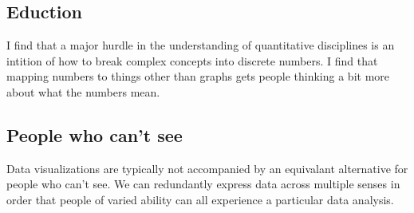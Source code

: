 \documentclass{acm_proc_article-sp}
\begin{document}
\subsection{Eduction}
I find that a major hurdle in the understanding of quantitative disciplines
is an intition of how to break complex concepts into discrete numbers.
I find that mapping numbers to things other than graphs gets people thinking
a bit more about what the numbers mean.

\subsection{People who can't see}
Data visualizations are typically not accompanied by an equivalant
alternative for people who can't see. We can redundantly express data
across multiple senses in order that people of varied ability can all
experience a particular data analysis.



\balancecolumns
\end{document}
